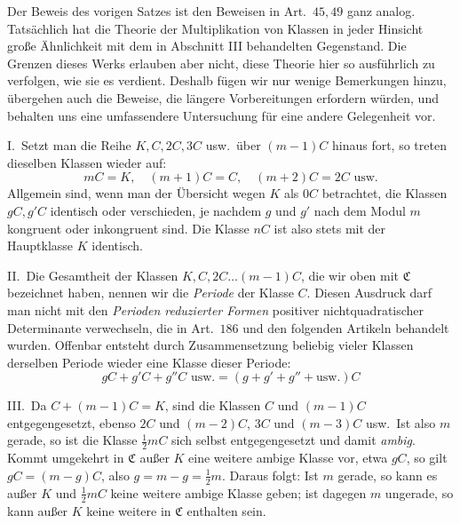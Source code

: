 Der Beweis des vorigen Satzes ist den Beweisen in Art.\ \(45,49\) ganz analog. Tatsächlich hat die Theorie der Multiplikation von Klassen in jeder Hinsicht große Ähnlichkeit mit dem in Abschnitt III behandelten Gegenstand. Die Grenzen dieses Werks erlauben aber nicht, diese Theorie hier so ausführlich zu verfolgen, wie sie es verdient. Deshalb fügen wir nur wenige Bemerkungen hinzu, übergehen auch die Beweise, die längere Vorbereitungen erfordern würden, und behalten uns eine umfassendere Untersuchung für eine andere Gelegenheit vor.

I.\ Setzt man die Reihe \(K,C,2C,3C\) usw.\ über \((m-1)C\) hinaus fort, so treten dieselben Klassen wieder auf:
\[mC=K,\quad(m+1)C=C,\quad(m+2)C=2C\text{ usw.}\]
Allgemein sind, wenn man der Übersicht wegen \(K\) als \(0C\) betrachtet, die Klassen \(gC,g'C\) identisch oder verschieden, je nachdem \(g\) und \(g'\) nach dem Modul \(m\) kongruent oder inkongruent sind. Die Klasse \(nC\) ist also stets mit der Hauptklasse \(K\) identisch.

II.\ Die Gesamtheit der Klassen \(K,C,2C\ldots(m-1)C\), die wir oben mit \(\mathfrak C\) bezeichnet haben, nennen wir die \textit{Periode} der Klasse \(C\). Diesen Ausdruck darf man nicht mit den \textit{Perioden reduzierter Formen} positiver nichtquadratischer Determinante verwechseln, die in Art.\ \(186\) und den folgenden Artikeln behandelt wurden. Offenbar entsteht durch Zusammensetzung beliebig vieler Klassen derselben Periode wieder eine Klasse dieser Periode:
\[gC+g'C+g''C\text{ usw.}=(g+g'+g''+\text{usw.})C\]


III.\ Da \(C+(m-1)C=K\), sind die Klassen \(C\) und \((m-1)C\) entgegengesetzt, ebenso \(2C\) und \((m-2)C\), \(3C\) und \((m-3)C\) usw.\ Ist also \(m\) gerade, so ist die Klasse \(\tfrac12mC\) sich selbst entgegengesetzt und damit \textit{ambig}. Kommt umgekehrt in \(\mathfrak C\) außer \(K\) eine weitere ambige Klasse vor, etwa \(gC\), so gilt \(gC=(m-g)C\), also \(g=m-g=\tfrac12m\). Daraus folgt: Ist \(m\) gerade, so kann es außer \(K\) und \(\tfrac12mC\) keine weitere ambige Klasse geben;
ist dagegen \(m\) ungerade, so kann außer \(K\) keine weitere in \(\mathfrak C\) enthalten sein.

